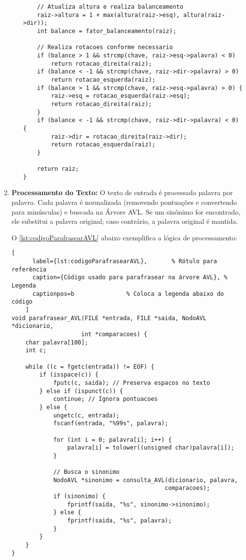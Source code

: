\documentclass[a4paper, 12pt, english]{article}
\begin{document}
\begin{enumerate}
\begin{itemize}
\begin{lstlisting}
    // Atualiza altura e realiza balanceamento
    raiz->altura = 1 + max(altura(raiz->esq), altura(raiz->dir));
    int balance = fator_balanceamento(raiz);

    // Realiza rotacoes conforme necessario
    if (balance > 1 && strcmp(chave, raiz->esq->palavra) < 0)
        return rotacao_direita(raiz);
    if (balance < -1 && strcmp(chave, raiz->dir->palavra) > 0)
        return rotacao_esquerda(raiz);
    if (balance > 1 && strcmp(chave, raiz->esq->palavra) > 0) {
        raiz->esq = rotacao_esquerda(raiz->esq);
        return rotacao_direita(raiz);
    }
    if (balance < -1 && strcmp(chave, raiz->dir->palavra) < 0) {
        raiz->dir = rotacao_direita(raiz->dir);
        return rotacao_esquerda(raiz);
    }

    return raiz;
}
\end{lstlisting}

\end{itemize}

\newpage
\item \textbf{Processamento do Texto:}
O texto de entrada é processado palavra por palavra. Cada palavra é normalizada (removendo pontuações e convertendo para minúsculas) e buscada na Árvore AVL. Se um sinônimo for encontrado, ele substitui a palavra original; caso contrário, a palavra original é mantida. 

O \autoref{lst:codigoParafrasearAVL} abaixo exemplifica a lógica de processamento:


    \begin{lstlisting}[
      label={lst:codigoParafrasearAVL},       % Rótulo para referência
      caption={Código usado para parafrasear na árvore AVL}, % Legenda
      captionpos=b               % Coloca a legenda abaixo do código
    ]
void parafrasear_AVL(FILE *entrada, FILE *saida, NodoAVL *dicionario, 
                    int *comparacoes) {
    char palavra[100];
    int c;

    while ((c = fgetc(entrada)) != EOF) {
        if (isspace(c)) {
            fputc(c, saida); // Preserva espacos no texto
        } else if (ispunct(c)) {
            continue; // Ignora pontuacoes
        } else {
            ungetc(c, entrada);
            fscanf(entrada, "%99s", palavra);

            for (int i = 0; palavra[i]; i++) {
                palavra[i] = tolower((unsigned char)palavra[i]);
            }

            // Busca o sinonimo
            NodoAVL *sinonimo = consulta_AVL(dicionario, palavra, 
                                            comparacoes);
            if (sinonimo) {
                fprintf(saida, "%s", sinonimo->sinonimo);
            } else {
                fprintf(saida, "%s", palavra);
            }
        }
    }
}
\end{lstlisting}


\end{enumerate}
\end{document}
